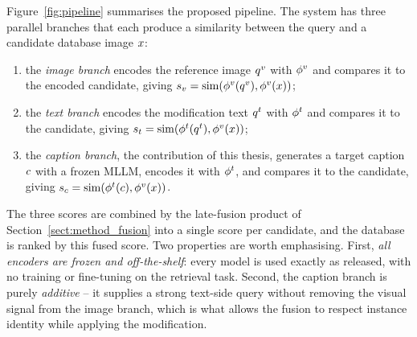 Figure~\ref{fig:pipeline} summarises the proposed pipeline. The system has three
parallel branches that each produce a similarity between the query and a
candidate database image $x$:
\begin{enumerate}
  \item the \emph{image branch} encodes the reference image $q^{v}$ with $\phi^{v}$
        and compares it to the encoded candidate, giving
        $s_{v} = \mathrm{sim}(\phi^{v}(q^{v}), \phi^{v}(x))$;
  \item the \emph{text branch} encodes the modification text $q^{t}$ with $\phi^{t}$
        and compares it to the candidate, giving
        $s_{t} = \mathrm{sim}(\phi^{t}(q^{t}), \phi^{v}(x))$;
  \item the \emph{caption branch}, the contribution of this thesis, generates a
        target caption $c$ with a frozen MLLM, encodes it with $\phi^{t}$, and
        compares it to the candidate, giving
        $s_{c} = \mathrm{sim}(\phi^{t}(c), \phi^{v}(x))$.
\end{enumerate}
The three scores are combined by the late-fusion product of
Section~\ref{sect:method_fusion} into a single score per candidate, and the
database is ranked by this fused score. Two properties are worth emphasising.
First, \emph{all encoders are frozen and off-the-shelf}: every model is used
exactly as released, with no training or fine-tuning on the retrieval task.
Second, the
caption branch is purely \emph{additive} -- it supplies a strong text-side query
without removing the visual signal from the image branch, which is what allows
the fusion to respect instance identity while applying the modification.

